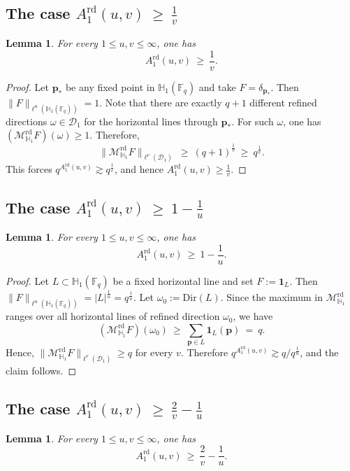 \documentclass[11pt]{article}
\newtheorem{lemma}[theorem]{Lemma}
\newcommand{\cD}{\mathcal{D}}
\newcommand{\1}{\mathbf 1}
\newcommand{\Fq}{\mathbb{F}_q}
\newcommand{\bfp}{\mathbf{p}}
\begin{document}
\subsection{The case $A^{\mathrm{rd}}_1(u,v)\ \ge\ \frac{1}{v}$}
\begin{lemma}\label{lem:rd-lb-pointmass}
For every $1\le u,v\le\infty$, one has
\[
A^{\mathrm{rd}}_1(u,v)\ \ge\ \frac{1}{v}.
\]
\end{lemma}

\begin{proof}
Let $\bfp_\ast$ be any fixed point in $\mathbb H_1(\Fq)$ and take $F=\delta_{\bfp_\ast}$. Then $\|F\|_{\ell^u(\mathbb H_1(\mathbb F_q))}=1$. Note that there are exactly $q+1$ different refined directions $\omega\in \cD_1$ for the horizontal lines through $\bfp_\ast$. For such $\omega$, one has $(\mathcal M^{\mathrm{rd}}_{\mathbb H_1}F)(\omega)\geq 1$. Therefore,
\[
\|\mathcal M^{\mathrm{rd}}_{\mathbb H_1}F\|_{\ell^v(\mathcal D_1)}
\ \ge\ (q+1)^{\frac{1}{v}}\ \geq\ q^{\frac{1}{v}}.
\]
This forces $q^{A^{\mathrm{rd}}_1(u,v)}\gtrsim q^{\frac{1}{v}}$, and hence
$A^{\mathrm{rd}}_1(u,v)\ge \frac{1}{v}$.
\end{proof}



\subsection{The case $A^{\mathrm{rd}}_1(u,v)\ \ge\ 1-\frac{1}{u}$}
\begin{lemma}\label{lem:rd-lb-single-line}
For every $1\le u,v\le\infty$, one has
\[
A^{\mathrm{rd}}_1(u,v)\ \ge\ 1-\frac{1}{u}.
\]
\end{lemma}

\begin{proof}
Let $L\subset\mathbb H_1(\mathbb F_q)$ be a fixed horizontal line and set $F:=\mathbf 1_L$.
Then $\|F\|_{\ell^u(\mathbb H_1(\mathbb F_q))}=|L|^{\frac{1}{u}}=q^{\frac{1}{u}}$.
Let $\omega_0:=\mathrm{Dir}(L)$.
Since the maximum in $\mathcal M^{\mathrm{rd}}_{\mathbb H_1}$ ranges over all horizontal lines
of refined direction $\omega_0$, we have
\[
(\mathcal M^{\mathrm{rd}}_{\mathbb H_1}F)(\omega_0)\ \ge\ \sum_{\mathbf p\in L}\mathbf 1_L(\mathbf p)\ =\ q.
\]
Hence, $\|\mathcal M^{\mathrm{rd}}_{\mathbb H_1}F\|_{\ell^v(\mathcal D_1)}\ge q$ for every $v$.
Therefore $q^{A^{\mathrm{rd}}_1(u,v)}\gtrsim q/q^{\frac{1}{u}}$, and the claim follows.
\end{proof}


\subsection{The case $A^{\mathrm{rd}}_1(u,v)\ \ge\ \frac{2}{v}-\frac{1}{u}$}
\begin{lemma}\label{lem:rd-lb-blocking}
For every $1\le u,v\le\infty$, one has
\[
A^{\mathrm{rd}}_1(u,v)\ \ge\ \frac{2}{v}-\frac{1}{u}.
\]
\end{lemma}
\end{document}
